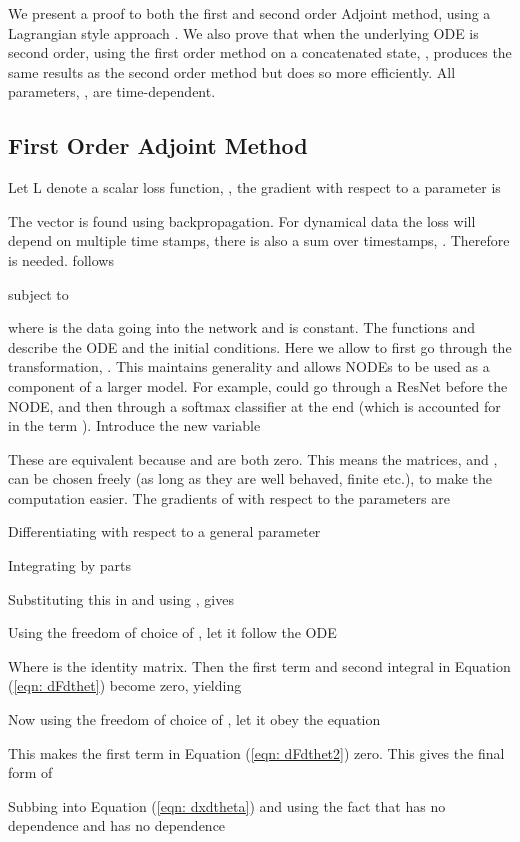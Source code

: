 \documentclass{article}
\theoremstyle{remark}
\theoremstyle{definition}
\begin{document}
We present a proof to both the first and second order Adjoint method, using a Lagrangian style approach \citep{stanford_adjoint_derivation, Gholaminejad_2019}. We also prove that when the underlying ODE is second order, using the first order method on a concatenated state, , produces the same results as the second order method but does so more efficiently. All parameters, , are time-dependent.

\subsection{First Order Adjoint Method}

Let L denote a scalar loss function, , the gradient with respect to a parameter  is


The vector  is found using backpropagation. For dynamical data the loss will depend on multiple time stamps, there is also a sum over timestamps, . Therefore  is needed.  follows

subject to


where  is the data going into the network and is constant. The functions  and  describe the ODE and the initial conditions. Here we allow  to first go through the transformation, . This maintains generality and allows NODEs to be used as a component of a larger model. For example,  could go through a ResNet before the NODE, and then through a softmax classifier at the end (which is accounted for in the term ). Introduce the new variable 


These are equivalent because  and  are both zero. This means the matrices,  and , can be chosen freely (as long as they are well behaved, finite etc.), to make the computation easier. The gradients of  with respect to the parameters are


Differentiating  with respect to a general parameter 


Integrating by parts


Substituting this in and using , gives


Using the freedom of choice of , let it follow the ODE


Where  is the identity matrix. Then the first term and second integral in Equation (\ref{eqn: dFdthet}) become zero, yielding


Now using the freedom of choice of , let it obey the equation


This makes the first term in Equation (\ref{eqn: dFdthet2}) zero. This gives the final form of 


Subbing into Equation (\ref{eqn: dxdtheta}) and using the fact that  has no  dependence and  has no  dependence
\end{document}

